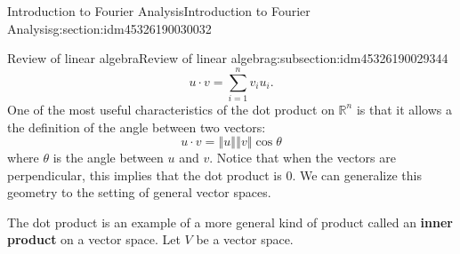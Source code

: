 \documentclass[oneside,10pt,]{article}
\newcommand{\terminology}[1]{\textbf{#1}}
\numberwithin{equation}{section}
\newcommand{\R}{\mathbb{R}}
\newcommand{\norm}[1]{\left\Vert#1\right\Vert}
\numberwithin{equation}{section}
\begin{document}
\begin{sectionptx}{Introduction to Fourier Analysis}{}{Introduction to Fourier Analysis}{}{}{g:section:idm45326190030032}
\begin{subsectionptx}{Review of linear algebra}{}{Review of linear algebra}{}{}{g:subsection:idm45326190029344}
\begin{equation*}
u \cdot v = \sum_{i=1}^n v_i u_i.
\end{equation*}
One of the most useful characteristics of the dot product on \(\R^n\) is that it allows a the definition of the angle between two vectors:%
\begin{equation*}
u \cdot v = \norm{u}\norm{v} \cos \theta
\end{equation*}
where \(\theta\) is the angle between \(u\) and \(v\). Notice that when the vectors are perpendicular, this implies that the dot product is 0. We can generalize this geometry to the setting of general vector spaces.%
\par
The dot product is an example of a more general kind of product called an \terminology{inner product} on a vector space. Let \(V\) be a vector space.%
\end{subsectionptx}
\end{sectionptx}
%
%
\typeout{************************************************}
\typeout{************************************************}
%
\end{document}
